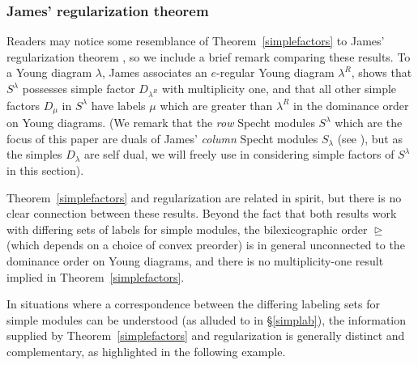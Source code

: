 \documentclass[Unicode,ALCO]{cedram}
\newcommand{\0}{{\bar 0}}
\begin{document}
\subsubsection{James' regularization theorem}\label{JamesSec} Readers may notice some resemblance of Theorem~\ref{simplefactors} to James' regularization theorem \cite[Theorem A]{JamesDecMat2}, so we include a brief remark comparing these results. To a Young diagram \(\lambda\), James associates an \(e\)-regular Young diagram \(\lambda^R\), shows that \(S^\lambda\) possesses simple factor \(D_{\lambda^R}\) with multiplicity one, and that all other simple factors \(D_\mu\) in \(S^\lambda\) have labels \(\mu\) which are greater than \(\lambda^R\) in the dominance order on Young diagrams. (We remark that the {\em row} Specht modules \(S^\lambda\) which are the focus of this paper are duals of James' {\em column} Specht modules \(S_\lambda\) (see \cite{KMRUnivSpecht}), but as the simples \(D_\lambda\) are self dual, we will freely use \cite{JamesDecMat2,JamesBookRepSym} in considering simple factors of \(S^\lambda\) in this section).

Theorem~\ref{simplefactors} and regularization are related in spirit, but there is no clear connection between these results. Beyond the fact that both results work with differing sets of labels for simple modules, the bilexicographic order \(\trianglerighteq\) (which depends on a choice of convex preorder) is in general unconnected to the dominance order on Young diagrams, and there is no multiplicity-one result implied in Theorem~\ref{simplefactors}.

In situations where a correspondence between the differing labeling sets for simple modules can be understood (as alluded to in \S\ref{simplab}), the information supplied by Theorem~\ref{simplefactors} and regularization is generally distinct and complementary, as highlighted in the following example.
\end{document}
